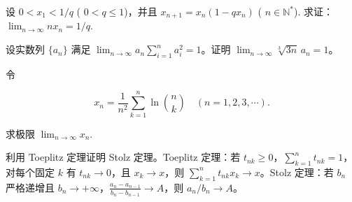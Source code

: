\noindent\begin{minipage}{\textwidth}
设  $ 0 < x_1 < 1/q $ ( $ 0 < q \leq 1 $)，并且  $ x_{n+1} = x_n (1 - qx_n) $ ( $ n \in \mathbb{N}^* $). 求证： $ \lim_{n \to \infty} nx_n = 1/q $.
\end{minipage}\par\vfill
\newpage
\noindent\begin{minipage}{\textwidth}
设实数列 $\{a_n\}$ 满足 $\lim_{n\to\infty}a_n\sum_{i=1}^na_i^2=1$。证明 $\lim_{n\to\infty}\sqrt[3]{3n}\,a_n=1$。
\end{minipage}\par\vfill
\noindent\begin{minipage}{\textwidth}
令

\[x_{n}=\frac{1}{n^{2}}\sum_{k=1}^{n}\ln\binom{n}{k}\quad(n=1,2,3,\cdots).\]

求极限  $ \lim_{n\to\infty}x_n $.
\end{minipage}\par\vfill
\noindent\begin{minipage}{\textwidth}
利用 Toeplitz 定理证明 Stolz 定理。Toeplitz 定理：若 $t_{nk}\ge0$，$\sum_{k=1}^nt_{nk}=1$，对每个固定 $k$ 有 $t_{nk}\to0$，且 $x_k\to x$，则 $\sum_{k=1}^nt_{nk}x_k\to x$。Stolz 定理：若 $b_n$ 严格递增且 $b_n\to+\infty$，$\frac{a_n-a_{n-1}}{b_n-b_{n-1}}\to A$，则 $a_n/b_n\to A$。
\end{minipage}\par\vfill
